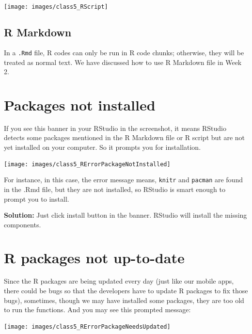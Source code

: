 \documentclass[
  11pt,
]{book}
\begin{document}
\begin{center}\texttt{[image: images/class5\_RScript]} \end{center}

\hypertarget{r-markdown-1}{%
\subsection{R Markdown}\label{r-markdown-1}}

In a \texttt{.Rmd} file, R codes can only be run in R code chunks; otherwise, they will be treated as normal text. We have discussed how to use R Markdown file in Week 2.

\hypertarget{packages-not-installed}{%
\section{Packages not installed}\label{packages-not-installed}}

If you see this banner in your RStudio in the screenshot, it means RStudio detects some packages mentioned in the R Markdown file or R script but are not yet installed on your computer. So it prompts you for installation.

\begin{center}\texttt{[image: images/class5\_RErrorPackageNotInstalled]} \end{center}

For instance, in this case, the error message means, \texttt{knitr} and \texttt{pacman} are found in the .Rmd file, but they are not installed, so RStudio is smart enough to prompt you to install.

\textbf{Solution:} Just click install button in the banner. RStudio will install the missing components.

\hypertarget{r-packages-not-up-to-date}{%
\section{R packages not up-to-date}\label{r-packages-not-up-to-date}}

Since the R packages are being updated every day (just like our mobile apps, there could be bugs so that the developers have to update R packages to fix those bugs), sometimes, though we may have installed some packages, they are too old to run the functions. And you may see this prompted message:

\begin{center}\texttt{[image: images/class5\_RErrorPackageNeedsUpdated]} \end{center}
\end{document}
